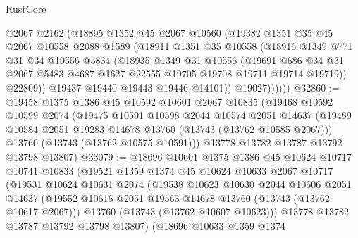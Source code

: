 \begin{lexlean}{RustCore}
\begin{coremodule}
                @2067
                @2162
                (@18895
                  @1352
                  @45
                  @2067
                  @10560
                  (@19382
                    @1351
                    @35
                    @45
                    @2067
                    @10558
                    @2088
                    @1589
                    (@18911
                      @1351
                      @35
                      @10558
                      (@18916
                        @1349
                        @771
                        @31
                        @34
                        @10556
                        @5834
                        (@18935
                          @1349
                          @31
                          @10556
                          (@19691
                            @686
                            @34
                            @31
                            @2067
                            @5483
                            @4687
                            @1627
                            @22555
                            @19705
                            @19708
                            @19711
                            @19714
                            @19719))
                        @22809))
                    @19437
                    @19440
                    @19443
                    @19446
                    @14101))
                @19027))))))
@32860 := @19458
    @1375
    @1386
    @45
    @10592
    @10601
    @2067
    @10835
    (@19468
      @10592
      @10599
      @2074
      (@19475
        @10591
        @10598
        @2044
        @10574
        @2051
        @14637
        (@19489 @10584 @2051 @19283 @14678 @13760 (@13743 (@13762 @10585 @2067)))
        @13760
        (@13743 (@13762 @10575 @10591)))
      @13778
      @13782
      @13787
      @13792
      @13798
      @13807)
@33079 := @18696
    @10601
    @1375
    @1386
    @45
    @10624
    @10717
    @10741
    @10833
    (@19521
      @1359
      @1374
      @45
      @10624
      @10633
      @2067
      @10717
      (@19531
        @10624
        @10631
        @2074
        (@19538
          @10623
          @10630
          @2044
          @10606
          @2051
          @14637
          (@19552 @10616 @2051 @19563 @14678 @13760 (@13743 (@13762 @10617 @2067)))
          @13760
          (@13743 (@13762 @10607 @10623)))
        @13778
        @13782
        @13787
        @13792
        @13798
        @13807)
      (@18696
        @10633
        @1359
        @1374

\end{coremodule}
\end{lexlean}

